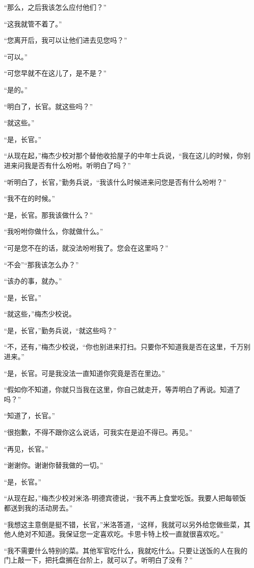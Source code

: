     “那么，之后我该怎么应付他们？”

    “这我就管不着了。”

    “您离开后，我可以让他们进去见您吗？”

    “可以。”

    “可您早就不在这儿了，是不是？”

    “是的。”

    “明白了，长官。就这些吗？”

    “就这些。”

    “是，长官。”

    “从现在起，”梅杰少校对那个替他收拾屋子的中年士兵说，“我在这儿的时候，你别进来问我是否有什么吩咐。听明白了吗？”

    “听明白了，长官，”勤务兵说，“我该什么时候进来问您是否有什么吩咐？”

    “我不在的时候。”

    “是，长官。那我该做什么？”

    “我吩咐你做什么，你就做什么。”

    “可是您不在的话，就没法吩咐我了。您会在这里吗？”

    “不会”“那我该怎么办？”

    “该办的事，就办。”

    “是，长官。”

    “就这些，”梅杰少校说。

    “是，长官，”勤务兵说，“就这些吗？”

    “不，还有，”梅杰少校说，“你也别进来打扫。只要你不知道我是否在这里，千万别进来。”

    “是，长官。可是我没法一直知道你究竟是否在里边。”

    “假如你不知道，你就只当我在这里，你自己就走开，等弄明白了再说。知道了吗？”

    “知道了，长官。”

    “很抱歉，不得不跟你这么说话，可我实在是迫不得已。再见。”

    “再见，长官。”

    “谢谢你。谢谢你替我做的一切。”

    “是，长官。”

    “从现在起，”梅杰少校对米洛-明德宾德说，“我不再上食堂吃饭。我要人把每顿饭都送到我的活动房去。”

    “我想这主意倒是挺不错，长官，”米洛答道，“这样，我就可以另外给您做些菜，其他人绝对不知道。我保证您一定喜欢吃。卡思卡特上校一直就很喜欢吃。”

    “我不需要什么特别的菜。其他军官吃什么，我就吃什么。只要让送饭的人在我的门上敲一下，把托盘搁在台阶上，就可以了。听明白了没有？”

